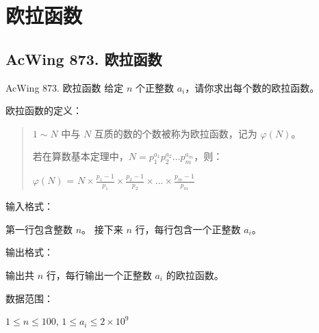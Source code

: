 \section{欧拉函数}

\subsection{AcWing 873. 欧拉函数}
\begin{titledbox}{AcWing 873. 欧拉函数}
给定 $n$ 个正整数 $a_i$，请你求出每个数的欧拉函数。

欧拉函数的定义：

\begin{quote}
$1 \sim N$ 中与 $N$ 互质的数的个数被称为欧拉函数，记为 $\varphi(N)$。

若在算数基本定理中，$N = p_1^{a_1}p_2^{a_2}\dots p_m^{a_m}$，则：

$\varphi (N)$ = $N \times \frac{p_1-1}{p_1} \times \frac{p_2-1}{p_2} \times \dots \times \frac{p_m-1}{p_m}$
\end{quote}

输入格式：

第一行包含整数 $n$。 接下来 $n$ 行，每行包含一个正整数 $a_i$。

输出格式：

输出共 $n$ 行，每行输出一个正整数 $a_i$ 的欧拉函数。

数据范围：

$1 \le n \le 100$, $1 \le a_i \le 2 \times 10^9$

\begin{inputblock}
 \\
 \\
 \\
    \end{inputblock}
    \begin{outputblock}
         \\
         \\
    \end{outputblock}
\end{titledbox}

